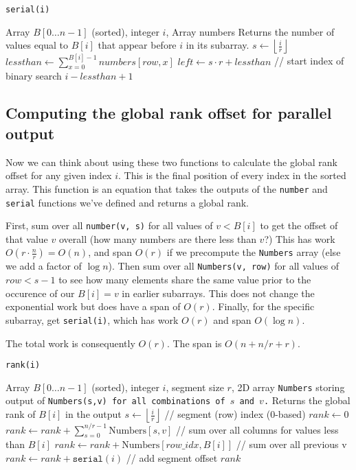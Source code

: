 \documentclass[11pt]{article}
\theoremstyle{definition}
\begin{document}
\begin{algorithm}[H]
\caption{\texttt{serial(i)}}
\begin{algorithmic}[1]
\REQUIRE Array $B[0 \ldots n-1]$ (sorted), integer $i$, Array numbers
\ENSURE Returns the number of values equal to $B[i]$ that appear before $i$ in its subarray.
\STATE $s \gets \left\lfloor \frac{i}{r} \right\rfloor$
\STATE $lessthan \gets \sum\limits_{x=0}^{B[i]-1} numbers[row, x]$
\STATE $left \gets s \cdot r + lessthan$ \hfill // start index of binary search
\RETURN $i - lessthan + 1$
\end{algorithmic}
\end{algorithm}

\subsection{Computing the global rank offset for parallel output}

Now we can think about using these two functions to calculate the global rank offset for any given index $i$. This is the final position of every index in the sorted array. This function is an equation that takes the outputs of the \texttt{number} and \texttt{serial} functions we've defined and returns a global rank.

First, sum over all \texttt{number(v, s)} for all values of $v < B[i]$ to get the offset of that value $v$ overall (how many numbers are there less than $v$?) This has work $O(r \cdot \frac{n}{r}) = O(n)$, and span $O(r)$ if we precompute the \texttt{Numbers} array (else we add a factor of $\log n$). Then sum over all \texttt{Numbers(v, row)} for all values of $row < s-1$ to see how many elements share the same value prior to the occurence of our $B[i] = v$ in earlier subarrays. This does not change the exponential work but does have a span of $O(r)$. Finally, for the specific subarray, get \texttt{serial(i)}, which has work $O(r)$ and span $O(\log n)$. 

The total work is consequently $O(r)$. The span is $O(n + n/r + r)$. 

\begin{algorithm}[H]
\caption{\texttt{rank(i)}}
\begin{algorithmic}[1]
\REQUIRE Array $B[0 \ldots n-1]$ (sorted), integer $i$, segment size $r$, 2D array \texttt{Numbers} storing output of \texttt{Numbers(s,v) for all combinations of $s$ and $v$.}
\ENSURE Returns the global rank of $B[i]$ in the output
\STATE $s \gets \left\lfloor \frac{i}{r} \right\rfloor$ \hfill // segment (row) index (0-based)
\STATE $rank \gets 0$
        \STATE $rank \gets rank + \sum\limits_{s=0}^{n/r-1} \text{Numbers}[s, v]$ \hfill // sum over all columns for values less than $B[i]$
    \ENDFOR
\ENDIF
{}
    \STATE $rank \gets rank + \text{Numbers}[row\_idx, B[i]]$ \hfill // sum over all previous v
\ENDFOR
\STATE $rank \gets rank + \texttt{serial}(i)$ \hfill // add segment offset
\RETURN $rank$
\end{algorithmic}
\end{algorithm}
\end{document}
